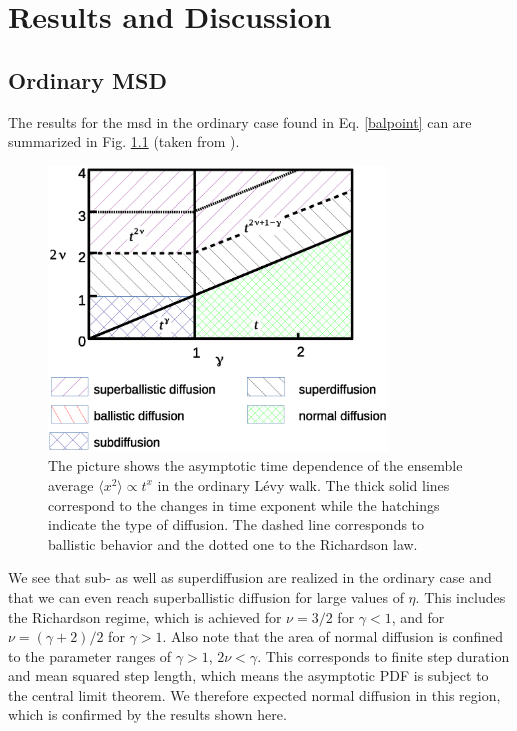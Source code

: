 \chapter{Results and Discussion}

\section{Ordinary MSD}



The results for the \gls{msd} in the ordinary case found in Eq. \ref{balpoint} can are summarized in Fig. \ref{fig:resultsMSDordinary} (taken from \cite{bothe}).

\begin{figure}[h!]
\begin{center}
\includegraphics[width=90mm]{pics/resultsMSDordinary.eps}
\caption{The picture shows the asymptotic time dependence of the ensemble average $\langle x^2 \rangle \propto t^{x}$ in the ordinary L\'evy walk. The thick solid lines correspond to the changes in time exponent while the hatchings indicate the type of diffusion. The dashed line corresponds to ballistic behavior and the dotted one to the Richardson law.
\label{fig:resultsMSDordinary} }
\end{center}
\end{figure} 

We see that sub- as well as superdiffusion are realized in the ordinary case and that we can even reach superballistic diffusion for large values of $\eta$. This includes the Richardson regime, which is achieved for $\nu = 3/2$ for $\gamma <1$, and for $\nu = (\gamma + 2)/2$ for $\gamma > 1$. Also note that the area of normal diffusion is confined to the parameter ranges of $\gamma>1$, $2\nu < \gamma$. This corresponds to finite step duration and mean squared step length, which means the asymptotic \gls{PDF} is subject to the central limit theorem. We therefore expected normal diffusion in this region, which is confirmed by the results shown here.

